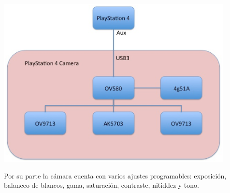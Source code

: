 \begin{minipage}{\linewidth}
    \centering
    \includegraphics[width=0.9\textwidth]{images/cap3/PlaystationCameraDiagrama.eps}
    \label{fig:Playstation-Camera-Diagram}
\end{minipage}

Por su parte la cámara cuenta con varios ajustes programables: exposición,
balanceo de blancos, gama, saturación, contraste, nitiddez y tono.



